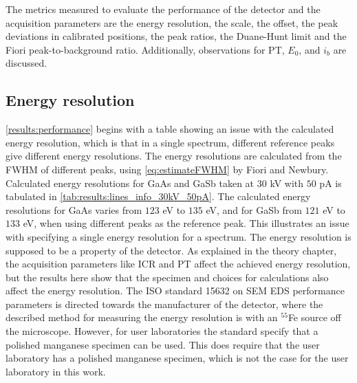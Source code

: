 The metrics measured to evaluate the performance of the detector and the acquisition parameters are the energy resolution, the scale, the offset, the peak deviations in calibrated positions, the peak ratios, the Duane-Hunt limit and the Fiori peak-to-background ratio.
Additionally, observations for PT, $E_0$, and $i_b$ are discussed.



\subsection{Energy resolution}
\label{discussion:energy_resolution}


\cref{results:performance} begins with a table showing an issue with the calculated energy resolution, which is that in a single spectrum, different reference peaks give different energy resolutions.
The energy resolutions are calculated from the FWHM of different peaks, using \cref{eq:estimateFWHM} by Fiori and Newbury.
Calculated energy resolutions for GaAs and GaSb taken at $30$ kV with $50$ pA is tabulated in \cref{tab:results:lines_info_30kV_50pA}.
The calculated energy resolutions for GaAs varies from $123$ eV to $135$ eV, and for GaSb from $121$ eV to $133$ eV,  when using different peaks as the reference peak.
This illustrates an issue with specifying a single energy resolution for a spectrum.
The energy resolution is supposed to be a property of the detector.
As explained in the theory chapter, the acquisition parameters like ICR and PT affect the achieved energy resolution, but the results here show that the specimen and choices for calculations also affect the energy resolution.
The ISO standard 15632 \cite{iso_qc_15632} on SEM EDS performance parameters is directed towards the manufacturer of the detector, where the described method for measuring the energy resolution is with an $^{55}$Fe source off the microscope.
However, for user laboratories the standard specify that a polished manganese specimen can be used.
This does require that the user laboratory has a polished manganese specimen, which is not the case for the user laboratory in this work.


